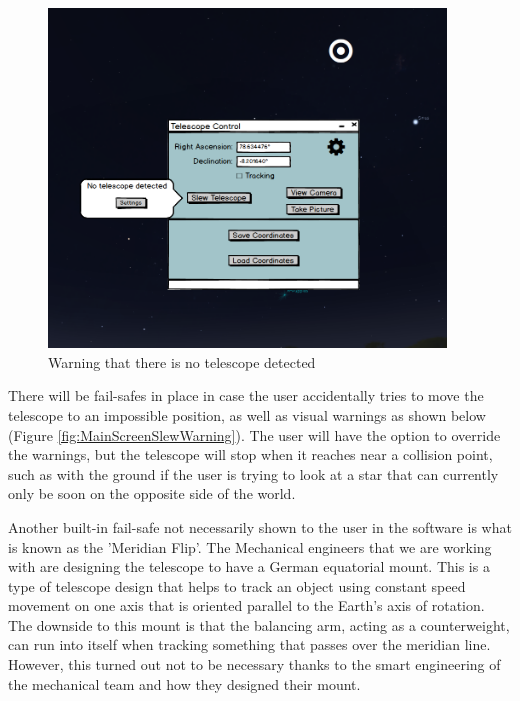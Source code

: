 \documentclass[12pt]{article}
\begin{document}
\newpage


\begin{figure}[h]
	\centering
	\includegraphics[width=0.70\linewidth, height=9cm]{MainScreenNoTelescope}
	\caption{Warning that there is no telescope detected}
	\label{fig:MainScreenNoTelescope}
\end{figure}

There will be fail-safes in place in case the user accidentally tries to move the telescope to an impossible position, as well as visual warnings as shown below (Figure \ref{fig:MainScreenSlewWarning}). The user will have the option to override the warnings, but the telescope will stop when it reaches near a collision point, such as with the ground if the user is trying to look at a star that can currently only be soon on the opposite side of the world.

Another built-in fail-safe not necessarily shown to the user in the software is what is known as the 'Meridian Flip'. The Mechanical engineers that we are working with are designing the telescope to have a German equatorial mount. This is a type of telescope design that helps to track an object using constant speed movement on one axis that is oriented parallel to the Earth's axis of rotation. The downside to this mount is that the balancing arm, acting as a counterweight, can run into itself when tracking something that passes over the meridian line. However, this turned out not to be necessary thanks to the smart engineering of the mechanical team and how they designed their mount.



\newpage
\end{document}
